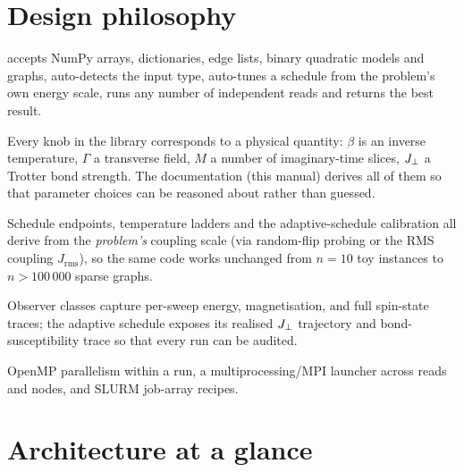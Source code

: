\section{Design philosophy}

\begin{description}[style=nextline]
\item[One call to solve.]  accepts
NumPy arrays, dictionaries, edge lists,  binary quadratic models
and  graphs, auto-detects the input type, auto-tunes a
schedule from the problem's own energy scale, runs any number of independent
reads and returns the best result.

\item[Physics first.] Every knob in the library corresponds to a physical
quantity: $\beta$ is an inverse temperature, $\Gamma$ a transverse field,
$M$ a number of imaginary-time slices, $J_{\perp}$ a Trotter bond strength.
The documentation (this manual) derives all of them so that parameter
choices can be reasoned about rather than guessed.

\item[Nothing hard-coded.] Schedule endpoints, temperature ladders and the
adaptive-schedule calibration all derive from the \emph{problem's} coupling
scale (via random-flip probing or the RMS coupling $J_{\mathrm{rms}}$),
so the same code works unchanged from $n=10$ toy instances to
$n>100\,000$ sparse graphs.

\item[Research instrumentation.] Observer classes capture per-sweep energy,
magnetisation, and full spin-state traces; the adaptive schedule exposes its
realised $J_{\perp}$ trajectory and bond-susceptibility trace so that every run can
be audited.

\item[HPC ready.] OpenMP parallelism within a run, a multiprocessing/MPI
launcher across reads and nodes, and SLURM job-array recipes.
\end{description}

\section{Architecture at a glance}

